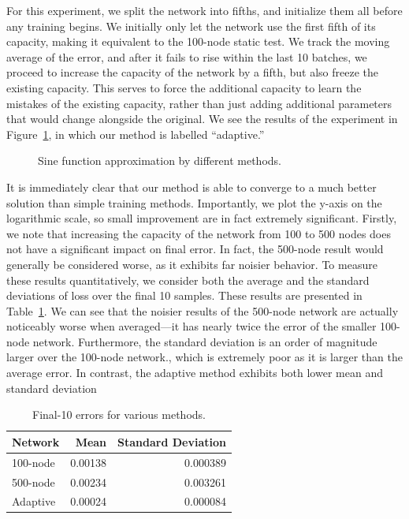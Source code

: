 For this experiment, we split the network into fifths, and initialize them all before any training begins.
We initially only let the network use the first fifth of its capacity, making it equivalent to the 100-node static test.
We track the moving average of the error, and after it fails to rise within the last 10 batches, we proceed to increase the capacity of the network by a fifth, but also freeze the existing capacity.
This serves to force the additional capacity to learn the mistakes of the existing capacity, rather than just adding additional parameters that would change alongside the original.
We see the results of the experiment in Figure~\ref{fig:sin_loss}, in which our method is labelled ``adaptive.''

\begin{figure}[!htb]
\centering
\resizebox{0.8\textwidth}{!}{}
\caption{Sine function approximation by different methods.}
\label{fig:sin_loss}
\end{figure}

It is immediately clear that our method is able to converge to a much better solution than simple training methods.
Importantly, we plot the y-axis on the logarithmic scale, so small improvement are in fact extremely significant.
Firstly, we note that increasing the capacity of the network from 100 to 500 nodes does not have a significant impact on final error.
In fact, the 500-node result would generally be considered worse, as it exhibits far noisier behavior.
To measure these results quantitatively, we consider both the average and the standard deviations of loss over the final 10 samples.
These results are presented in Table~\ref{table:sin_errors}.
We can see that the noisier results of the 500-node network are actually noticeably worse when averaged---it has nearly twice the error of the smaller 100-node network.
Furthermore, the standard deviation is an order of magnitude larger over the 100-node network., which is extremely poor as it is larger than the average error.
In contrast, the adaptive method exhibits both lower mean and standard deviation

\begin{table}[!htb]
\centering
\caption{Final-10 errors for various methods.}
\label{table:sin_errors}
\begin{tabular}{@{}lrr@{}}
\toprule
Network  & Mean    & Standard Deviation \\ \midrule
100-node & 0.00138 & 0.000389           \\
500-node & 0.00234 & 0.003261           \\
Adaptive & 0.00024 & 0.000084           \\ \bottomrule
\end{tabular}
\end{table}



